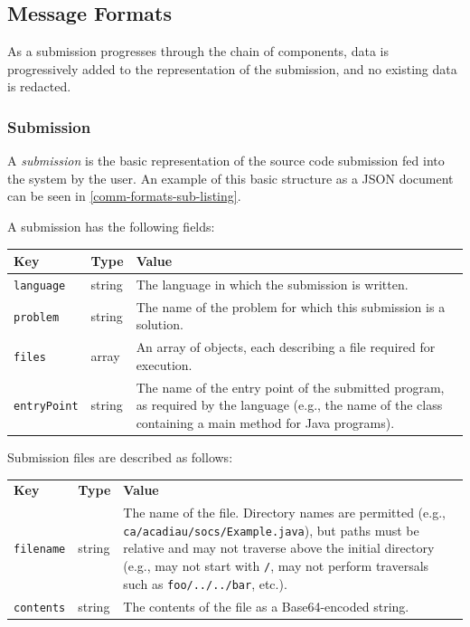 \documentclass[11pt,letterpaper]{article}
\begin{document}
\subsection{Message Formats}
\label{comm-formats}

As a submission progresses through the chain of components, data is
progressively added to the representation of the submission, and no existing
data is redacted.

\subsubsection{Submission}
\label{comm-formats-sub}

A \emph{submission} is the basic representation of the source code submission
fed into the system by the user. An example of this basic structure as a JSON
document can be seen in \autoref{comm-formats-sub-listing}.

A submission has the following fields:

\nopagebreak
\begin{tabulary}{\textwidth}{ | l | l | L | }
    \hline
    \textbf{Key} & \textbf{Type} & \textbf{Value} \\
    \hline
    \texttt{language} & string & The language in which the submission is
        written. \\
    \hline
    \texttt{problem} & string & The name of the problem for which this
        submission is a solution. \\
    \hline
    \texttt{files} & array & An array of objects, each describing a file
        required for execution. \\
    \hline
    \texttt{entryPoint} & string & The name of the entry point of the submitted
        program, as required by the language (e.g., the name of the class
        containing a main method for Java programs). \\
    \hline
\end{tabulary}

Submission files are described as follows:

\nopagebreak
\begin{tabulary}{\textwidth}{ | l | l | L | }
    \hline
    \textbf{Key} & \textbf{Type} & \textbf{Value} \\
    \texttt{filename} & string & The name of the file. Directory names are
        permitted (e.g., \texttt{ca/acadiau/socs/Example.java}), but paths must
        be relative and may not traverse above the initial directory (e.g., may
        not start with \texttt{/}, may not perform traversals such as
        \texttt{foo/../../bar}, etc.). \\
    \hline
    \texttt{contents} & string & The contents of the file as a Base64-encoded
        string. \\
    \hline
\end{tabulary}
\end{document}
